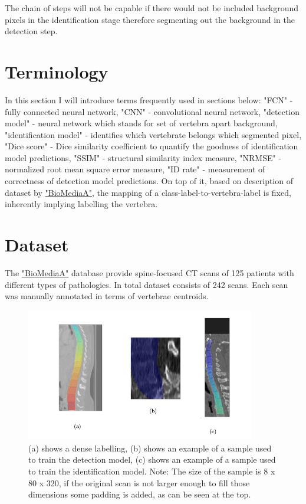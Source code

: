 The chain of steps will not be capable if there would not be included background pixels in the identification stage therefore segmenting out the background in the detection step.

\section{Terminology} 
In this section I will introduce terms frequently used in sections below: "FCN" - fully connected neural network, "CNN" - convolutional neural network, "detection model" - neural network which stands for set of vertebra apart background, "identification model" - identifies which vertebrate belongs which segmented pixel, "Dice score" - Dice similarity coefficient to quantify the goodness of identification model predictions, "SSIM" - structural similarity index measure, "NRMSE" - normalized root mean square error measure, "ID rate" - measurement of correctness of detection model predictions. On top of it, based on description of dataset by \href{https://biomedia.doc.ic.ac.uk/}{\color{blue}"BioMediaA"}, the mapping of a class-label-to-vertebra-label is fixed, inherently implying labelling the vertebra.    

\section{Dataset}
The \href{https://biomedia.doc.ic.ac.uk/}{\color{blue}"BioMediaA"} database provide spine-focused CT scans of 125 patients with different types of pathologies. In total dataset consists of 242 scans. Each scan was manually annotated in terms of vertebrae centroids. 

\begin{figure}[h]
    \centering \includegraphics[width=10cm]{images/labeled_data.png}
    \caption {(a) shows a dense labelling, (b) shows an example of a sample used to train the detection model, (c) shows an example of a sample used to train the identification model. Note: The size of the sample is 8 x 80 x 320, if the original scan is not larger enough to fill those dimensions some padding is added, as can be seen at the top.}
    \label{fig:labeled_data}
\end{figure}

